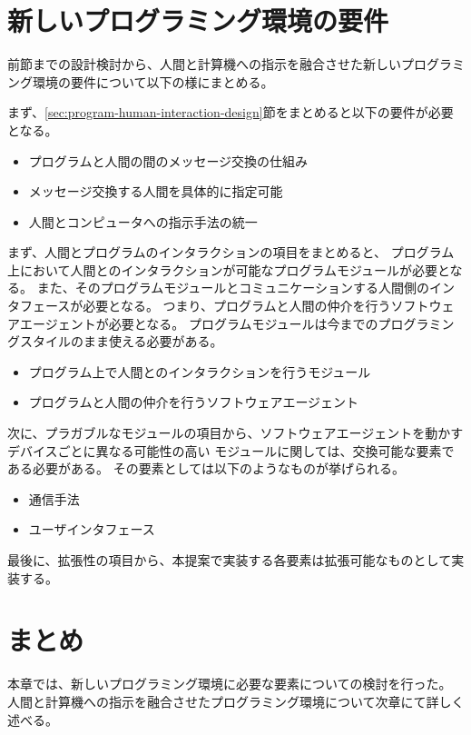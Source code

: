 \section{新しいプログラミング環境の要件}\label{ux65b0ux3057ux3044ux30d7ux30edux30b0ux30e9ux30dfux30f3ux30b0ux74b0ux5883ux306eux8981ux4ef6}

前節までの設計検討から、人間と計算機への指示を融合させた新しいプログラミング環境の要件について以下の様にまとめる。

まず、\ref{sec:program-human-interaction-design}節をまとめると以下の要件が必要となる。

\begin{itemize}
\itemsep1pt\parskip0pt
\item
  プログラムと人間の間のメッセージ交換の仕組み
\item
  メッセージ交換する人間を具体的に指定可能
\item
  人間とコンピュータへの指示手法の統一
\end{itemize}

まず、人間とプログラムのインタラクションの項目をまとめると、
プログラム上において人間とのインタラクションが可能なプログラムモジュールが必要となる。
また、そのプログラムモジュールとコミュニケーションする人間側のインタフェースが必要となる。
つまり、プログラムと人間の仲介を行うソフトウェアエージェントが必要となる。
プログラムモジュールは今までのプログラミングスタイルのまま使える必要がある。

\begin{itemize}
\itemsep1pt\parskip0pt
\item
  プログラム上で人間とのインタラクションを行うモジュール
\item
  プログラムと人間の仲介を行うソフトウェアエージェント
\end{itemize}

次に、プラガブルなモジュールの項目から、ソフトウェアエージェントを動かすデバイスごとに異なる可能性の高い
モジュールに関しては、交換可能な要素である必要がある。
その要素としては以下のようなものが挙げられる。

\begin{itemize}
\itemsep1pt\parskip0pt
\item
  通信手法
\item
  ユーザインタフェース
\end{itemize}

最後に、拡張性の項目から、本提案で実装する各要素は拡張可能なものとして実装する。

\section{まとめ}\label{ux307eux3068ux3081}

本章では、新しいプログラミング環境に必要な要素についての検討を行った。
人間と計算機への指示を融合させたプログラミング環境について次章にて詳しく述べる。

